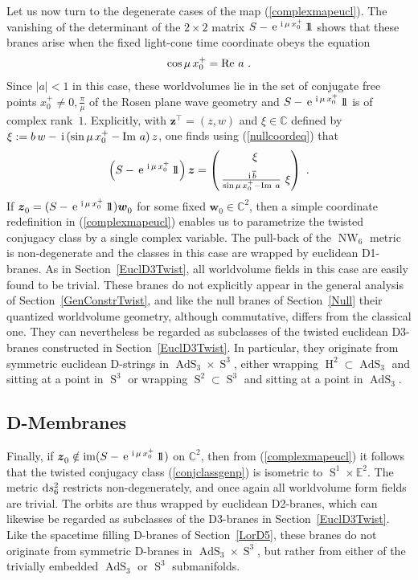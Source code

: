 \documentclass[11pt,a4paper]{article}
\DeclareMathOperator{\AdS}{AdS}
\DeclareMathOperator{\Sphere}{S}
\DeclareMathOperator{\NW}{NW}
\DeclareMathOperator{\Hyp}{H}
\let\S\Sphere
\newcommand{\ii}{{\rm i}}
\newcommand{\mbf}[1]{{\boldsymbol {#1} }}
\def\ii{{\,{\rm i}\,}}
\def\dd{{\rm d}}
\def\mz{{\mbf z}}
\def\mw{{\mbf w}}
\newcommand{\complex}{{\mathbb C}} %
\newcommand{\eucl}{{\mathbb E}}
\newcommand{\id}{{1\!\!1}} %
\def\e{{\,\rm e}\,}
\newcommand{\beq}{\begin{eqnarray}}
\newcommand{\eeq}{\end{eqnarray}}
\begin{document}
Let us now turn to the degenerate cases of the map
(\ref{complexmapeucl}). The vanishing of the determinant of the
$2\times2$ matrix $S-\e^{\ii\mu\,x_0^+}\,\id$ shows that these branes
arise when the fixed light-cone time coordinate obeys the equation
\beq
\cos\mu\,x_0^+={\rm Re}~a \ .
\label{nullcoordeq}\eeq
Since $|a|<1$ in this case, these worldvolumes lie in the set of
conjugate free points $x_0^+\neq0,\frac\pi\mu$ of the Rosen plane wave
geometry and $S-\e^{\ii\mu\,x_0^+}\,\id$ is of complex
rank~$1$. Explicitly, with $\mz^\top=(z,w)$ and $\xi\in\complex$
defined by $\xi:=b\,w-\ii(\sin\mu\,x_0^+-{\rm Im}~a)\,z$, one finds
using (\ref{nullcoordeq}) that
\beq
\left(S-\e^{\ii\mu\,x_0^+}\,\id\right)\mz=\begin{pmatrix}
\xi\\[2mm]\,\frac{\ii\overline{b}}{\sin\mu\,x_0^+-{\rm Im}~a}~\xi
\end{pmatrix} \ .
\label{Sdegexpl}\eeq
If $\mz_0^{~}=(S-\e^{\ii\mu\,x_0^+}\,\id)\mw_0^{~}$ for some fixed
$\mw_0^{~}\in\complex^2$, then a simple coordinate redefinition in
(\ref{complexmapeucl}) enables us to parametrize the twisted conjugacy
class by a single complex variable. The pull-back of the $\NW_6$
metric is non-degenerate and the classes in this case are wrapped by
euclidean D1-branes. As in Section~\ref{EuclD3Twist}, all worldvolume
fields in this case are easily found to be trivial. These branes
do not explicitly appear in the general analysis of
Section~\ref{GenConstrTwist}, and like the null branes of
Section~\ref{Null} their quantized worldvolume geometry, although
commutative, differs from the classical one. They can nevertheless be
regarded as subclasses of the twisted euclidean D3-branes constructed in
Section~\ref{EuclD3Twist}. In particular, they originate from
symmetric euclidean D-strings in $\AdS_3\times\S^3$, either wrapping
$\Hyp^2\subset\AdS_3$ and sitting at a point in $\S^3$ or wrapping
$\S^2\subset\S^3$ and sitting at a point in $\AdS_3$.

\subsection{D-Membranes\label{DMem}}

Finally, if $\mz_0^{~}\notin{\rm im}(S-\e^{\ii\mu\,x_0^+}\,\id)$ on
$\complex^2$, then from (\ref{complexmapeucl}) it follows that the
twisted conjugacy class (\ref{conjclassgenp}) is isometric to
$\S^1\times\eucl^2$. The metric $\dd s_6^2$ restricts
non-degenerately, and once again all worldvolume form fields are
trivial. The orbits are thus wrapped by euclidean D2-branes, which can
likewise be regarded as subclasses of the D3-branes in
Section~\ref{EuclD3Twist}. Like the spacetime filling D-branes of
Section~\ref{LorD5}, these branes do not originate from symmetric
D-branes in $\AdS_3\times\S^3$, but rather from either of the
trivially embedded $\AdS_3$ or $\S^3$ submanifolds.
\end{document}
